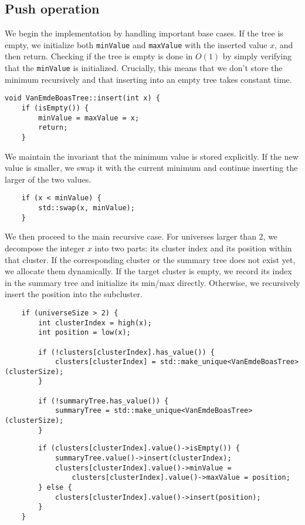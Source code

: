 \subsection{Push operation}

We begin the implementation by handling important base cases. If the tree is empty, we initialize both \texttt{minValue} and \texttt{maxValue} with the inserted value \( x \), and then return. Checking if the tree is empty is done in \(O(1)\) by simply verifying that the \texttt{minValue} is initialized. Crucially, this means that we don't store the minimum recursively and that inserting into an empty tree takes constant time.

\begin{verbatim}
void VanEmdeBoasTree::insert(int x) {
    if (isEmpty()) {
        minValue = maxValue = x;
        return;
    }
\end{verbatim}

We maintain the invariant that the minimum value is stored explicitly. If the new value is smaller, we swap it with the current minimum and continue inserting the larger of the two values.

\begin{verbatim}
    if (x < minValue) {
        std::swap(x, minValue);
    }
\end{verbatim}

We then proceed to the main recursive case. For universes larger than 2, we decompose the integer \( x \) into two parts: its cluster index and its position within that cluster. If the corresponding cluster or the summary tree does not exist yet, we allocate them dynamically. If the target cluster is empty, we record its index in the summary tree and initialize its min/max directly. Otherwise, we recursively insert the position into the subcluster.

\begin{verbatim}
    if (universeSize > 2) {
        int clusterIndex = high(x);
        int position = low(x);

        if (!clusters[clusterIndex].has_value()) {
            clusters[clusterIndex] = std::make_unique<VanEmdeBoasTree>(clusterSize);
        }

        if (!summaryTree.has_value()) {
            summaryTree = std::make_unique<VanEmdeBoasTree>(clusterSize);
        }
\end{verbatim}

\begin{verbatim}
        if (clusters[clusterIndex].value()->isEmpty()) {
            summaryTree.value()->insert(clusterIndex);
            clusters[clusterIndex].value()->minValue = 
                clusters[clusterIndex].value()->maxValue = position;
        } else {
            clusters[clusterIndex].value()->insert(position);
        }
    }
\end{verbatim}

